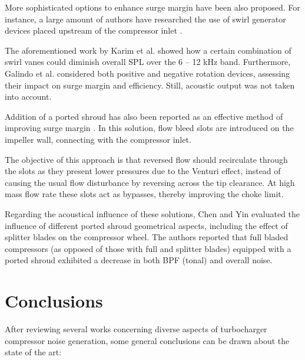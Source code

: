 More sophisticated options to enhance surge margin have been also proposed. For instance, a large amount of authors have researched the use of swirl generator devices placed upstream of the compressor inlet \cite{kyrtatos1980application,coppinger2000performance}. 

The aforementioned work by Karim et al. \cite{karim2013computational} showed how a certain combination of swirl vanes could diminish overall SPL over the 6 -- 12 kHz band. Furthermore, Galindo et al. \cite{galindo2007potential} considered both positive and negative rotation devices, assessing their impact on surge margin and efficiency. Still, acoustic output was not taken into account.

Addition of a ported shroud has also been reported as an effective method of improving surge margin \cite{guillou2010characterization,semlitsch2014numerical}. In this solution, flow bleed slots are introduced on the impeller wall, connecting with the compressor inlet. 

The objective of this approach is that reversed flow should recirculate through the slots as they present lower pressures due to the Venturi effect, instead of causing the usual flow disturbance by reversing across the tip clearance. At high mass flow rate these slots act as bypasses, thereby improving the choke limit. 

Regarding the acoustical influence of these solutions, Chen and Yin \cite{chen2006turboc} evaluated the influence of different ported shroud geometrical aspects, including the effect of splitter blades on the compressor wheel. The authors reported that full bladed compressors (as opposed of those with full and splitter blades) equipped with a ported shroud exhibited a decrease in both BPF (tonal) and overall noise.

\section{Conclusions}

After reviewing several works concerning diverse aspects of turbocharger compressor noise generation, some general conclusions can be drawn about the state of the art:

